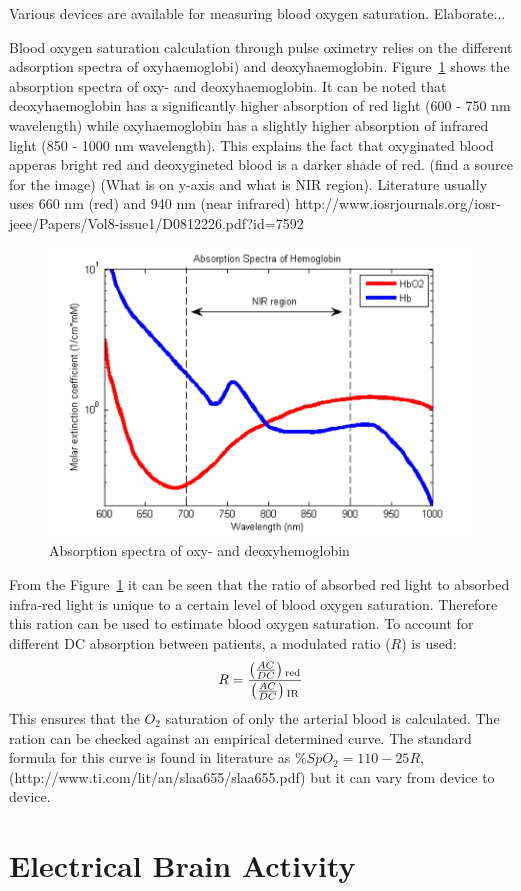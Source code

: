Various devices are available for measuring blood oxygen saturation. Elaborate...

Blood oxygen saturation calculation through pulse oximetry relies on the different adsorption spectra of oxyhaemoglobi) and deoxyhaemoglobin. Figure~\ref{fig:AbsorptionSpectra} shows the absorption spectra of oxy- and deoxyhaemoglobin. It can be noted that deoxyhaemoglobin has a significantly higher absorption of red light (600 - 750 nm wavelength) while oxyhaemoglobin has a slightly higher absorption of infrared light (850 - 1000 nm wavelength). This explains the fact that oxyginated blood apperas bright red and deoxygineted blood is a darker shade of red. (find a source for the image) (What is on y-axis and what is NIR region). Literature usually uses 660 nm (red) and 940 nm (near infrared) http://www.iosrjournals.org/iosr-jeee/Papers/Vol8-issue1/D0812226.pdf?id=7592

\begin{figure}
   \centering
   \includegraphics[scale=0.8]{figs/AbsorptionSpectra}
   \caption{Absorption spectra of oxy- and deoxyhemoglobin}
   \label{fig:AbsorptionSpectra}
\end{figure}

From the Figure~\ref{fig:AbsorptionSpectra} it can be seen that the ratio of absorbed red light to absorbed infra-red light is unique to a certain level of blood oxygen saturation. Therefore this ration can be used to estimate blood oxygen saturation. To account for different DC absorption between patients, a modulated ratio ($R$) is used:
$$R = \frac{\left(\frac{AC}{DC}\right)\textsubscript{red}}{\left(\frac{AC}{DC}\right)\textsubscript{IR}} $$
This ensures that the $ O_2 $ saturation of only the arterial blood is calculated. The ration can be checked against an empirical determined curve. The standard formula for this curve is found in literature as $ \% SpO_2 = 110-25R $, (http://www.ti.com/lit/an/slaa655/slaa655.pdf) but it can vary from device to device. 


\section{Electrical Brain Activity}
